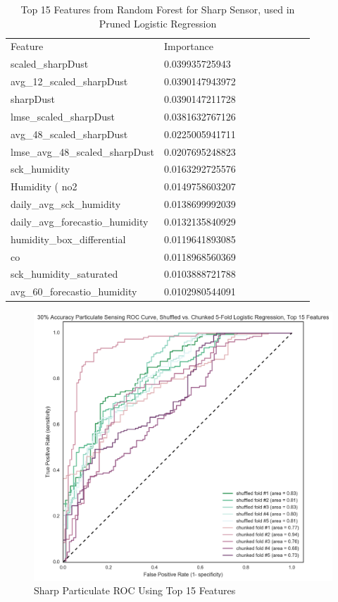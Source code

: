 \begin{table}[H]
\centering
\begin{tabular}{lllllllll}
\\
\\
\toprule
Feature & Importance \\
\midrule
 scaled\_sharpDust &  0.039935725943 \\
 avg\_12\_scaled\_sharpDust &  0.0390147943972 \\
 sharpDust &  0.0390147211728 \\
 lmse\_scaled\_sharpDust &  0.0381632767126 \\
 avg\_48\_scaled\_sharpDust &  0.0225005941711 \\
 lmse\_avg\_48\_scaled_sharpDust &  0.0207695248823 \\
 sck\_humidity &  0.0163292725576 \\
 Humidity ( %
 no2 &  0.0149758603207 \\
 daily\_avg\_sck\_humidity &  0.0138699992039 \\
 daily\_avg\_forecastio\_humidity &  0.0132135840929 \\
 humidity\_box\_differential &  0.0119641893085 \\
 co &  0.0118968560369 \\
 sck\_humidity\_saturated &  0.0103888721788 \\
 avg\_60\_forecastio\_humidity &  0.0102980544091 \\
\bottomrule
\end{tabular}
\label{tab:sharp_randomforest_features}
\caption{Top 15 Features from Random Forest for Sharp Sensor, used in Pruned Logistic Regression}
\end{table}



\begin{figure}[htb]
 	\includegraphics[width=\textwidth]{figs/sharp_goals_30_roc_pruned_features}               
 	 \caption{Sharp Particulate ROC Using Top 15 Features}
  	\label{fig:sharp_30_roc_pruned_features}
\end{figure}

